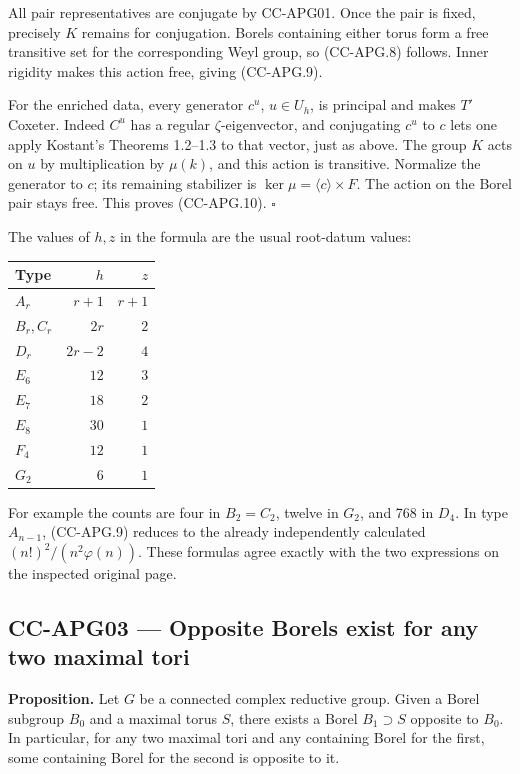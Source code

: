 All pair representatives are conjugate by CC-APG01. Once the pair is
fixed, precisely \(K\) remains for conjugation. Borels containing either
torus form a free transitive set for the corresponding Weyl group, so
(CC-APG.8) follows. Inner rigidity makes this action free, giving
(CC-APG.9).

For the enriched data, every generator \(c^u\), \(u\in U_h\), is
principal and makes \(T'\) Coxeter. Indeed \(C^u\) has a regular
\(\zeta\)-eigenvector, and conjugating \(c^u\) to \(c\) lets one apply
Kostant's Theorems 1.2--1.3 to that vector, just as above. The group
\(K\) acts on \(u\) by multiplication by \(\mu(k)\), and this action is
transitive. Normalize the generator to \(c\); its remaining stabilizer
is \(\ker\mu=\langle c\rangle\times F\). The action on the Borel pair
stays free. This proves (CC-APG.10). \(\square\)

The values of \(h,z\) in the formula are the usual root-datum values:

\begin{longtable}[]{@{}lrr@{}}
\toprule\noalign{}
Type & \(h\) & \(z\) \\
\midrule\noalign{}
\endhead
\bottomrule\noalign{}
\endlastfoot
\(A_r\) & \(r+1\) & \(r+1\) \\
\(B_r,C_r\) & \(2r\) & \(2\) \\
\(D_r\) & \(2r-2\) & \(4\) \\
\(E_6\) & \(12\) & \(3\) \\
\(E_7\) & \(18\) & \(2\) \\
\(E_8\) & \(30\) & \(1\) \\
\(F_4\) & \(12\) & \(1\) \\
\(G_2\) & \(6\) & \(1\) \\
\end{longtable}

For example the counts are four in \(B_2=C_2\), twelve in \(G_2\), and
768 in \(D_4\). In type \(A_{n-1}\), (CC-APG.9) reduces to the already
independently calculated \((n!)^2/(n^2\varphi(n))\). These formulas
agree exactly with the two expressions on the inspected original page.

\subsection{CC-APG03 --- Opposite Borels exist for any two maximal
tori}\label{cc-apg03-opposite-borels-exist-for-any-two-maximal-tori}

\textbf{Proposition.} Let \(G\) be a connected complex reductive group.
Given a Borel subgroup \(B_0\) and a maximal torus \(S\), there exists a
Borel \(B_1\supset S\) opposite to \(B_0\). In particular, for any two
maximal tori and any containing Borel for the first, some containing
Borel for the second is opposite to it.

